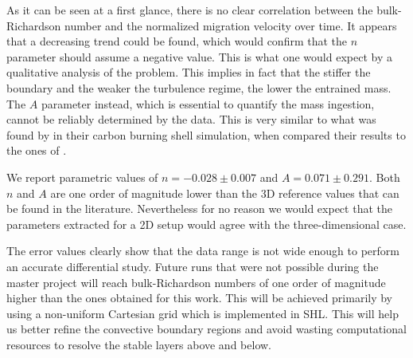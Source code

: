 As it can be seen at a first glance, there is no clear correlation between the bulk-Richardson number and the normalized migration velocity over time. It appears that a decreasing trend could be found, which would confirm that the $n$ parameter should assume a negative value. This is what one would expect by a qualitative analysis of the problem. This implies in fact that the stiffer the boundary and the weaker the turbulence regime, the lower the entrained mass. The $A$ parameter instead, which is essential to quantify the mass ingestion, cannot be reliably determined by the data. This is very similar to what was found by \citet{cristini} in their carbon burning shell simulation, when compared their results to the ones of \citet{meakin}. 

We report parametric values of $n=-0.028 \pm 0.007$ and $A=0.071 \pm 0.291$. Both $n$ and $A$ are one order of magnitude lower than the 3D reference values that can be found in the literature. Nevertheless for no reason we would expect that the parameters extracted for a 2D setup would agree with the three-dimensional case.

The error values clearly show that the data range is not wide enough to perform an accurate differential study. Future runs that were not possible during the master project will reach bulk-Richardson numbers of one order of magnitude higher than the ones obtained for this work. This will be achieved primarily by using a non-uniform Cartesian grid which is implemented in SHL. This will help us better refine the convective boundary regions and avoid wasting computational resources to resolve the stable layers above and below.

